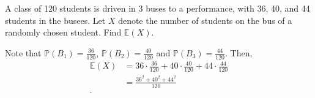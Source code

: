 \begin{eg}
	A class of 120 students is driven in 3 buses to a performance, with 36, 40, and 44 students in the busees. Let \( X \) denote the number of students on the bus of a randomly chosen student. Find \( \mathbb{E}(X) \).
\end{eg}
\begin{explanation}
	Note that \( \mathbb{P}(B_{1}) = \frac{36}{120} \), \( \mathbb{P}(B_{2}) = \frac{40}{120} \) and \( \mathbb{P}(B_{3})=\frac{44}{120} \). Then, 
	\begin{align*}
		\mathbb{E}(X) &= 36 \cdot \frac{36}{120} + 40 \cdot \frac{40}{120} + 44 \cdot \frac{44}{120} \\
		&= \frac{36^{2}+40^{2}+44^{2}}{120} \\
	.\end{align*}
\end{explanation}
